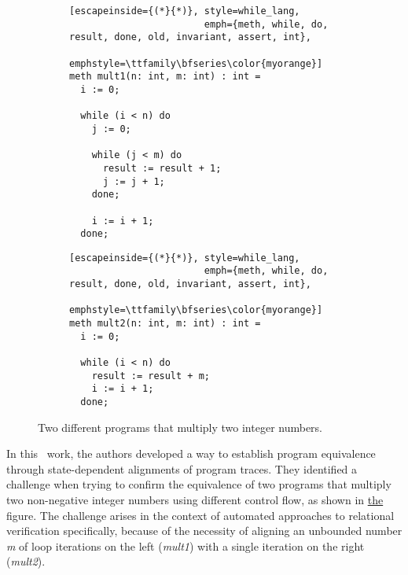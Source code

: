 \begin{figure}[h]
  \centering

  \begin{subfigure}[t]{0.49\textwidth}
    \centering
    \noindent
    \begin{lstlisting}[escapeinside={(*}{*)}, style=while_lang,
                        emph={meth, while, do, result, done, old, invariant, assert, int},
                        emphstyle=\ttfamily\bfseries\color{myorange}]
meth mult1(n: int, m: int) : int =
  i := 0;

  while (i < n) do
    j := 0;

    while (j < m) do
      result := result + 1;
      j := j + 1;
    done;

    i := i + 1;
  done;
    \end{lstlisting}
  \end{subfigure}
  \hfill
  \begin{subfigure}[t]{0.49\textwidth}
    \centering
    \noindent
    \begin{lstlisting}[escapeinside={(*}{*)}, style=while_lang,
                        emph={meth, while, do, result, done, old, invariant, assert, int},
                        emphstyle=\ttfamily\bfseries\color{myorange}]
meth mult2(n: int, m: int) : int =
  i := 0;

  while (i < n) do
    result := result + m;
    i := i + 1;
  done;
    \end{lstlisting}
  \end{subfigure}

  \caption{Two different programs that multiply two integer numbers.}
  \label{fig:mult_source_programs}
\end{figure}

In this~\cite{DBLP:conf/pldi/ChurchillP0A19} work, the authors developed a way to establish program equivalence through state-dependent alignments of program traces.
They identified a challenge when trying to confirm the equivalence of two programs that multiply two non-negative integer numbers using different control flow, as shown in \hyperref[fig:mult_source_programs]{the} figure.
The challenge arises in the context of automated approaches to relational verification specifically, because of the necessity of aligning an unbounded number \emph{m} of loop iterations on the left (\emph{mult1}) with a single iteration on the right (\emph{mult2}).

